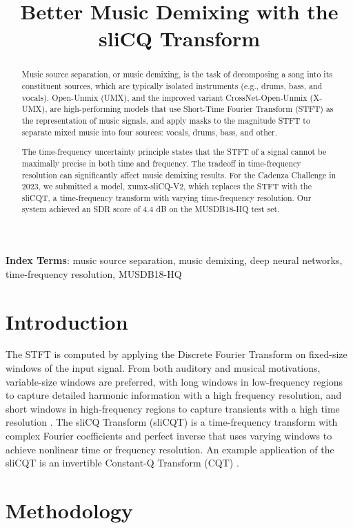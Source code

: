 \documentclass{INTERSPEECH2023}
\title{Better Music Demixing with the sliCQ Transform}
\begin{document}
\maketitle
 
\begin{abstract}
Music source separation, or music demixing, is the task of decomposing a song into its constituent sources, which are typically isolated instruments (e.g., drums, bass, and vocals). Open-Unmix (UMX), and the improved variant CrossNet-Open-Unmix (X-UMX), are high-performing models that use Short-Time Fourier Transform (STFT) as the representation of music signals, and apply masks to the magnitude STFT to separate mixed music into four sources: vocals, drums, bass, and other.

The time-frequency uncertainty principle states that the STFT of a signal cannot be maximally precise in both time and frequency. The tradeoff in time-frequency resolution can significantly affect music demixing results. For the Cadenza Challenge in 2023, we submitted a model, xumx-sliCQ-V2, which replaces the STFT with the sliCQT, a time-frequency transform with varying time-frequency resolution. Our system achieved an SDR score of 4.4 dB on the MUSDB18-HQ test set. 
\end{abstract}
\noindent\textbf{Index Terms}: music source separation, music demixing, deep neural networks, time-frequency resolution, MUSDB18-HQ

\section{Introduction}

The STFT is computed by applying the Discrete Fourier Transform on fixed-size windows of the input signal. From both auditory and musical motivations, variable-size windows are preferred, with long windows in low-frequency regions to capture detailed harmonic information with a high frequency resolution, and short windows in high-frequency regions to capture transients with a high time resolution \cite{doerflerphd}. The sliCQ Transform (sliCQT) \cite{slicq} is a time-frequency transform with complex Fourier coefficients and perfect inverse that uses varying windows to achieve nonlinear time or frequency resolution. An example application of the sliCQT is an invertible Constant-Q Transform (CQT) \cite{jbrown}.

\section{Methodology}
\end{document}
